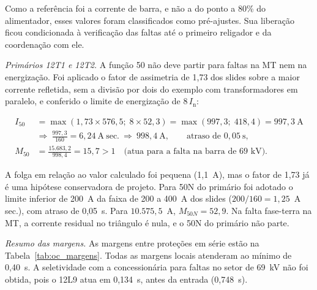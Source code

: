 Como a referência foi a corrente de barra, e não a do ponto a 80\% do alimentador, esses valores foram classificados como pré-ajustes. Sua liberação ficou condicionada à verificação das faltas até o primeiro religador e da coordenação com ele.

\textit{Primários 12T1 e 12T2.} A função 50 não deve partir para faltas na MT nem na energização. Foi aplicado o fator de assimetria de 1,73 dos slides sobre a maior corrente refletida, sem a divisão por dois do exemplo com transformadores em paralelo, e conferido o limite de energização de $8\,I_{\mathrm{n}}$:

\begin{equation}
    \begin{aligned}
        I_{50}&=\max\left(1{,}73\times576{,}5;\;8\times52{,}3\right)
            =\max(997{,}3;\;418{,}4)=997{,}3~\mathrm{A}\\
            &\Rightarrow\ \tfrac{997{,}3}{160}=6{,}24~\mathrm{A~sec.}
            \ \Rightarrow\ 998{,}4~\mathrm{A},
            \qquad \text{atraso de }0{,}05~\mathrm{s},\\
        M_{50}&=\frac{15.683{,}2}{998{,}4}=15{,}7>1
            \quad\text{(atua para a falta na barra de 69~kV)}.
    \end{aligned}
    \label{eq:oc_50_at}
\end{equation}

A folga em relação ao valor calculado foi pequena (1,1~A), mas o fator de 1,73 já é uma hipótese conservadora de projeto. Para 50N do primário foi adotado o limite inferior de 200~A da faixa de 200 a 400~A dos slides ($200/160=1{,}25$~A sec.), com atraso de 0,05~s. Para $10.575{,}5$~A, $M_{50N}=52{,}9$. Na falta fase-terra na MT, a corrente residual no triângulo é nula, e o 50N do primário não parte.

\textit{Resumo das margens.} As margens entre proteções em série estão na Tabela~\ref{tab:oc_margens}. Todas as margens locais atenderam ao mínimo de 0,40~s. A seletividade com a concessionária para faltas no setor de 69~kV não foi obtida, pois o 12L9 atua em 0,134~s, antes da entrada (0,748~s).

